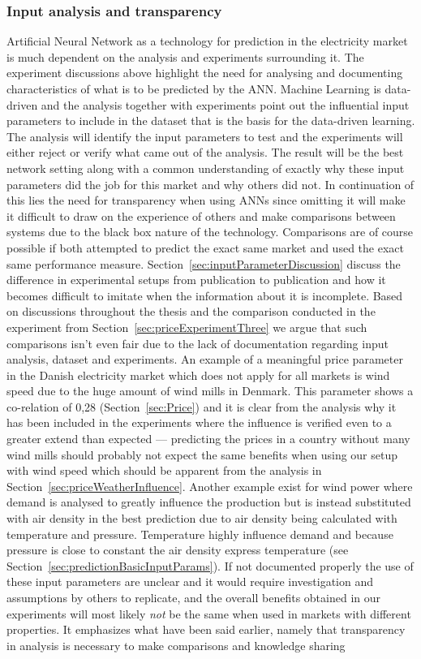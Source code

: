 \subsubsection{Input analysis and transparency}
Artificial Neural Network as a technology for prediction in the electricity market is much dependent on the analysis and experiments surrounding it. The experiment discussions above highlight the need for analysing and documenting characteristics of what is to be predicted by the ANN. Machine Learning is data-driven\cite{18} and the analysis together with experiments point out the influential input parameters to include in the dataset that is the basis for the data-driven learning. The analysis will identify the input parameters to test and the experiments will either reject or verify what came out of the analysis. The result will be the best network setting along with a common understanding of exactly why these input parameters did the job for this market and why others did not. In continuation of this lies the need for transparency when using ANNs since omitting it will make it difficult to draw on the experience of others and make comparisons between systems due to the black box nature of the technology. Comparisons are of course possible if both attempted to predict the exact same market and used the exact same performance measure. Section~\ref{sec:inputParameterDiscussion} discuss the difference in experimental setups from publication to publication and how it becomes difficult to imitate when the information about it is incomplete. Based on discussions throughout the thesis and the comparison conducted in the experiment from Section~\ref{sec:priceExperimentThree} we argue that such comparisons isn't even fair due to the lack of documentation regarding input analysis, dataset and experiments. An example of a meaningful price parameter in the Danish electricity market which does not apply for all markets is wind speed due to the huge amount of wind mills in Denmark. This parameter shows a co-relation of 0,28 (Section~\ref{sec:Price}) and it is clear from the analysis why it has been included in the experiments where the influence is verified even to a greater extend than expected --- predicting the prices in a country without many wind mills should probably not expect the same benefits when using our setup with wind speed which should be apparent from the analysis in Section~\ref{sec:priceWeatherInfluence}. Another example exist for wind power where demand is analysed to greatly influence the production but is instead substituted with air density in the best prediction due to air density being calculated with temperature and pressure. Temperature highly influence demand and because pressure is close to constant the air density express temperature (see Section~\ref{sec:predictionBasicInputParams}). If not documented properly the use of these input parameters are unclear and it would require investigation and assumptions by others to replicate, and the overall benefits obtained in our experiments will most likely \emph{not} be the same when used in markets with different properties. It emphasizes what have been said earlier, namely that transparency in analysis is necessary to make comparisons and knowledge sharing 
